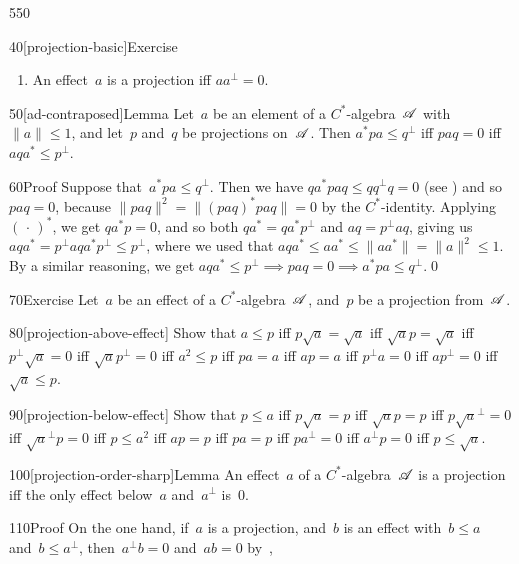 \begin{parsec}{550}
\begin{point}{40}[projection-basic]{Exercise}
\begin{enumerate}
is a projection.
\item
An effect~$a$ is a projection iff $aa^\perp=0$.
\end{enumerate}
\spacingfix%
\end{point}%
\begin{point}{50}[ad-contraposed]{Lemma}%
Let~$a$ be an element of a $C^*$-algebra~$\mathscr{A}$
with $\|a\|\leq 1$,
and let~$p$ and~$q$ be projections on~$\mathscr{A}$.
Then 
$a^* p a \leq q^\perp$
iff $paq=0$
iff  $aqa^*\leq p^\perp$.
\begin{point}{60}{Proof}%
Suppose that~$a^*pa\leq q^\perp$.
Then we have $q a^*pa q \leq qq^\perp q = 0$
(see )
and so $paq=0$,
because $\|paq\|^2=\|(paq)^*paq\|=0$
by the $C^*$-identity.
Applying $(\,\cdot\,)^*$,
we get $qa^*p=0$, and so both $qa^* = qa^*p^\perp$
and $aq = p^\perp aq$, giving
us $aqa^* = p^\perp a q a^* p^\perp 
\leq p^\perp$,
where we used that $aqa^*\leq aa^*\leq \|aa^*\|=\|a\|^2\leq 1$.
By a similar reasoning,
we get $aqa^*\leq p^\perp \implies paq=0\implies a^*pa\leq q^\perp$.\qed
\end{point}
\end{point}
\begin{point}{70}{Exercise}%
Let~$a$ be an effect of a $C^*$-algebra~$\mathscr{A}$,
and~$p$ be a projection from~$\mathscr{A}$.
\begin{point}{80}[projection-above-effect]%
Show that $a\leq p$
iff $p\sqrt{a} = \sqrt{a}$
iff $\sqrt{a}p = \sqrt{a}$
iff $p^\perp\sqrt{a} = 0$
iff $\sqrt{a}p^\perp = 0$
iff $a^2\leq p$
iff $p a  = a$
iff $ a p = a $
iff $p^\perp a  = 0$
iff $ap^\perp = 0$
iff $\sqrt{a}\leq p$.
\end{point}
\begin{point}{90}[projection-below-effect]%
Show that $p\leq a$
iff $p \sqrt{a} = p$
iff $\sqrt{a} p = p$
iff $ p\sqrt{a}^\perp = 0$
iff $\sqrt{a}^\perp p = 0$
iff $p\leq a^2$
iff $ap=p$
iff $pa = p$
iff $pa^\perp =0$
iff $a^\perp p =0$
iff $p\leq \sqrt{a}$.
\end{point}
\end{point}
\begin{point}{100}[projection-order-sharp]{Lemma}%
An effect~$a$ of a $C^*$-algebra~$\mathscr{A}$
is a projection iff the only effect
below~$a$ and~$a^\perp$ is~$0$.
\begin{point}{110}{Proof}%
On the one hand,
if~$a$ is a projection,
and~$b$ is an effect with~$b\leq a$
and~$b\leq a^\perp$,
then~$a^\perp b=0$ and~$ab=0$ by~,

\end{point}
\end{point}
\end{parsec}
